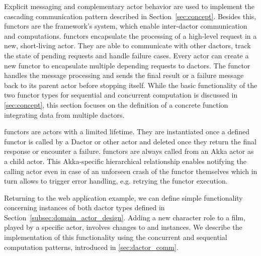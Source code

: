     Explicit messaging and complementary actor behavior are used to implement the cascading communication pattern described in Section~\ref{sec:concept}.
    Besides this, \glspl{functor} are the framework's system, which enable inter-\gls{dactor} communication and computations.
    \Glspl{functor} encapsulate the processing of a high-level request in a new, short-living actor.
    They are able to communicate with other \glspl{dactor}, track the state of pending requests and handle failure cases.
    Every actor can create a new \gls{functor} to encapsulate multiple depending requests to \glspl{dactor}.
    The \gls{functor} handles the message processing and sends the final result or a failure message back to its parent actor before stopping itself.
    While the basic functionality of the two \gls{functor} types for sequential and concurrent computation is discussed in \cref{sec:concept}, this section focuses on the definition of a concrete function integrating data from multiple \glspl{dactor}.
    
    \Glspl{functor} are actors with a limited lifetime.
    They are instantiated once a defined \gls{functor} is called by a Dactor or other actor and deleted once they return the final response or encounter a failure.
    \Glspl{functor} are always called from an Akka actor as a child actor.
    This Akka-specific hierarchical relationship enables notifying the calling actor even in case of an unforseen crash of the \gls{functor} themselves which in turn allows to trigger error handling, e.g. retrying the \gls{functor} execution.
    
    Returning to the web application example, we can define simple functionality concerning instances of both \gls{dactor} types defined in Section~\ref{subsec:domain_actor_design}.
    Adding a new character role to a film, played by a specific actor, involves changes to  and  instances.
    We describe the implementation of this functionality using the concurrent and sequential computation patterns, introduced in \cref{sec:dactor_comm}.
    
